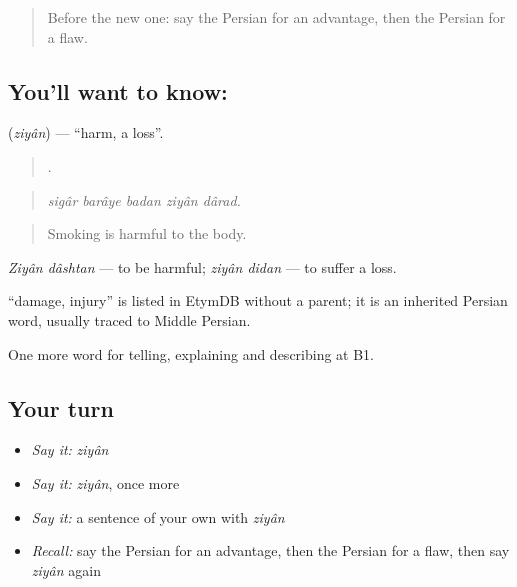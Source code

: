 \label{lesson:FA-C375-ziyan}



\begin{quote}
Before the new one: say the Persian for an advantage, then the Persian for a flaw.
\end{quote}

\subsection*{You'll want to know: }
\textbf{} (\emph{ziyân}) — \textquotedblleft{}harm, a loss\textquotedblright{}.

\begin{quote}
    .
\end{quote}

\begin{quote}
\emph{sigâr barâye badan ziyân dârad.}
\end{quote}

\begin{quote}
Smoking is harmful to the body.
\end{quote}

\emph{Ziyân dâshtan} — to be harmful; \emph{ziyân didan} — to suffer a loss.

\begin{cousinweb}
\textbf{} \textquotedblleft{}damage, injury\textquotedblright{} is listed in EtymDB without a parent; it is an inherited Persian word, usually traced to Middle Persian.
\end{cousinweb}

\begin{grammarlens}[title={What you've built}]
One more word for telling, explaining and describing at B1.
\end{grammarlens}

\subsection*{Your turn}
\begin{itemize}
\raggedright
  \item \emph{Say it:} \emph{ziyân}
  \item \emph{Say it:} \emph{ziyân}, once more
  \item \emph{Say it:} a sentence of your own with \emph{ziyân}
  \item \emph{Recall:} say the Persian for an advantage, then the Persian for a flaw, then say \emph{ziyân} again
\end{itemize}


